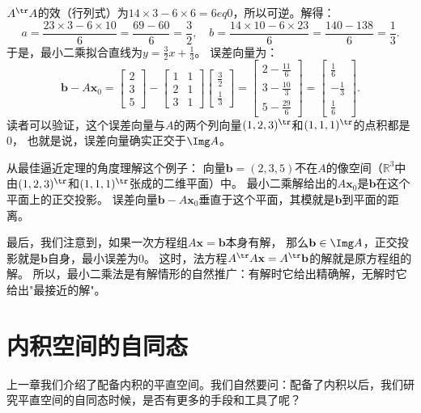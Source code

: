 \documentclass[12pt,UTF8]{ctexbook}
\begin{document}
$A^{\tr} A$的效（行列式）为$14 \times 3 - 6 \times 6 = 6 
eq 0$，所以可逆。解得：
$$ a = \frac{23 \times 3 - 6 \times 10}{6} = \frac{69 - 60}{6} = \frac{3}{2}, \quad b = \frac{14 \times 10 - 6 \times 23}{6} = \frac{140 - 138}{6} = \frac{1}{3}. $$
于是，最小二乘拟合直线为$y = \frac{3}{2}x + \frac{1}{3}$。
误差向量为：
$$ \mathbf{b} - A\mathbf{x}_0 = \begin{bmatrix} 2 \\ 3 \\ 5 \end{bmatrix} - \begin{bmatrix} 1 & 1 \\ 2 & 1 \\ 3 & 1 \end{bmatrix} \begin{bmatrix} \frac{3}{2} \\[2pt] \frac{1}{3} \end{bmatrix} = \begin{bmatrix} 2 - \frac{11}{6} \\[2pt] 3 - \frac{10}{3} \\[2pt] 5 - \frac{29}{6} \end{bmatrix} = \begin{bmatrix} \frac{1}{6} \\[2pt] -\frac{1}{3} \\[2pt] \frac{1}{6} \end{bmatrix}. $$
读者可以验证，这个误差向量与$A$的两个列向量$(1,2,3)^{\tr}$和$(1,1,1)^{\tr}$的点积都是$0$，
也就是说，误差向量确实正交于$\Img A$。

从最佳逼近定理的角度理解这个例子：
向量$\mathbf{b} = (2, 3, 5)$不在$A$的像空间（$\mathbb{R}^3$中由$(1,2,3)^{\tr}$和$(1,1,1)^{\tr}$张成的二维平面）中。
最小二乘解给出的$A\mathbf{x}_0$是$\mathbf{b}$在这个平面上的正交投影。
误差向量$\mathbf{b} - A\mathbf{x}_0$垂直于这个平面，其模就是$\mathbf{b}$到平面的距离。

最后，我们注意到，如果一次方程组$A\mathbf{x} = \mathbf{b}$本身有解，
那么$\mathbf{b} \in \Img A$，正交投影就是$\mathbf{b}$自身，最小误差为$0$。
这时，法方程$A^{\tr} A \mathbf{x} = A^{\tr} \mathbf{b}$的解就是原方程组的解。
所以，最小二乘法是有解情形的自然推广：有解时它给出精确解，无解时它给出"最接近的解"。


\chapter{内积空间的自同态}
上一章我们介绍了配备内积的平直空间。我们自然要问：配备了内积以后，我们研究平直空间的自同态时候，是否有更多的手段和工具了呢？
\end{document}
